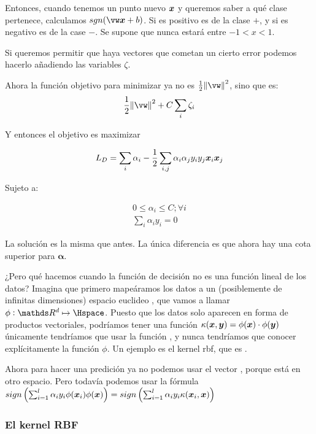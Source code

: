 \begin{note}
  Entonces, cuando tenemos un punto nuevo $\bm{x}$ y queremos saber a qué clase
  pertenece, calculamos $sgn(\vw\vx + b)$. Si es positivo es de la clase $+$,
  y si es negativo es de la case $-$. Se supone que nunca estará entre $-1 < x < 1$.


  Si queremos permitir que haya vectores que cometan un cierto error podemos
  hacerlo añadiendo las variables $\zeta$.

  Ahora la función objetivo para minimizar ya no es $\frac{1}{2}\norm{\vw}^2$,
  sino que es:
  \begin{equation}
    \frac{1}{2}\norm{\vw}^2 + C\sum_i \zeta_i
  \end{equation}

  Y entonces el objetivo es maximizar

  \begin{equation}
    L_D = \sum_i\alpha_i -\frac{1}{2}\sum_{i,j}\alpha_i\alpha_jy_iy_j\bm{x}_i\bm{x}_j
  \end{equation}

  Sujeto a:

  \begin{align}
    0 \leq \alpha_i \leq C; \forall i\\
    \sum_i \alpha_iy_i = 0
  \end{align}

  La solución es la misma que antes. La única diferencia es que ahora hay una
  cota superior para $\bm{\alpha}$.

  ¿Pero qué hacemos cuando la función de decisión no es una función lineal de
  los datos? Imagina que primero mapeáramos los datos a un (posiblemente
  de infinitas dimensiones) espacio euclideo \Hspace, que vamos a llamar
  $\phi: \reals^d \mapsto \Hspace$. Puesto que los datos solo aparecen en forma
  de productos vectoriales, podríamos tener una función
  $\kappa(\bm{x}, \bm{y}) = \phi(\bm{x})\cdot\phi(\bm{y})$
  únicamente tendríamos que usar la función , y nunca tendríamos que
  conocer explícitamente la función $\phi$. Un ejemplo es el kernel rbf, que es
  \rbf.

  Ahora para hacer una predición ya no podemos usar el vector \vw, porque está
  en otro espacio. Pero todavía podemos usar la fórmula
  $sign\left(\sum_{i = 1}^l \alpha_iy_i\phi(\bm{x}_i)\phi(\bm{x})\right)
  = sign\left(\sum_{i = 1}^l \alpha_iy_i\kappa(\bm{x}_i, \bm{x})\right)
  $

\end{note}

\subsubsection{El kernel RBF}

